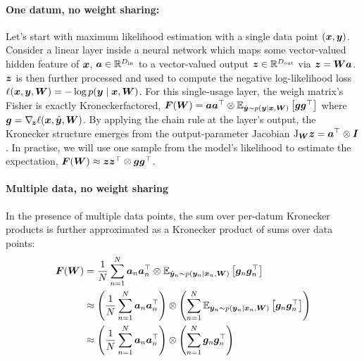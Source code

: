 \paragraph{One datum, no weight sharing:}
Let's start with maximum likelihood estimation with a single data point $({\bm{x}}, {\bm{y}})$.
Consider a linear layer inside a neural network which maps some vector-valued hidden feature of ${\bm{x}}$, ${\bm{a}} \in {\mathbb{R}}^{D_{\text{in}}}$ to a vector-valued output ${\bm{z}} \in {\mathbb{R}}^{D_{\text{out}}}$ via ${\bm{z}} = {\bm{W}} {\bm{a}}$.
${\bm{z}}$ is then further processed and used to compute the negative log-likelihood loss $\ell({\bm{x}}, {\bm{y}}, {\bm{W}}) = - \log p({\bm{y}} \mid {\bm{x}}, {\bm{W}})$.
For this single-usage layer, the weigh matrix's Fisher is exactly Kroneckerfactored, ${\bm{F}}({\bm{W}}) = {\bm{a}} {\bm{a}}^{\top} \otimes \mathbb{E}_{\hat{{\bm{y}}} \sim p({\bm{y}} \mid {\bm{x}}, {\bm{W}})}\left[ {\bm{g}} {\bm{g}}^{\top} \right]$ where ${\bm{g}} = \nabla_{\!{{\bm{z}}}} \ell({\bm{x}}, \hat{{\bm{y}}}, {\bm{W}})$.
By applying the chain rule at the layer's output, the Kronecker structure emerges from the output-parameter Jacobian $\mathrm{J}_{{\bm{W}}}{\bm{z}} = {\bm{a}}^{\top} \otimes {\bm{I}}$.
In practise, we will use one sample from the model's likelihood to estimate the expectation, ${\bm{F}}({\bm{W}}) \approx {\bm{z}} {\bm{z}}^{\top} \otimes {\bm{g}} {\bm{g}}^{\top}$.

\paragraph{Multiple data, no weight sharing}
In the presence of multiple data points, the sum over per-datum Kronecker products is further approximated as a Kronecker product of sums over data points:
\begin{align*}
  {\bm{F}}({\bm{W}})
  &=
    \frac{1}{N}
    \sum_{n=1}^N
    {\bm{a}}_n {\bm{a}}_n^{\top} \otimes \mathbb{E}_{\hat{{\bm{y}}}_n \sim p({\bm{y}}_n \mid {\bm{x}}_n, {\bm{W}})}\left[ {\bm{g}}_n {\bm{g}}_n^{\top} \right]
  \\
  &\approx
    \left(
    \frac{1}{N}
    \sum_{n=1}^N
    {\bm{a}}_n {\bm{a}}_n^{\top}
    \right)
    \otimes
    \left(
    \sum_{n=1}^N
    \mathbb{E}_{\hat{{\bm{y}}}_n \sim p({\bm{y}}_n \mid {\bm{x}}_n, {\bm{W}})}\left[ {\bm{g}}_n {\bm{g}}_n^{\top} \right]
    \right)
  \\
  &\approx
    \left(
    \frac{1}{N}
    \sum_{n=1}^N
    {\bm{a}}_n {\bm{a}}_n^{\top}
    \right)
    \otimes
    \left(
    \sum_{n=1}^N
    {\bm{g}}_n {\bm{g}}_n^{\top}
    \right)
\end{align*}


